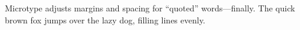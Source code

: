 \documentclass{article}
\begin{document}
Microtype adjusts margins and spacing for ``quoted'' words---finally.
The quick brown fox jumps over the lazy dog, filling lines evenly.
\end{document}
